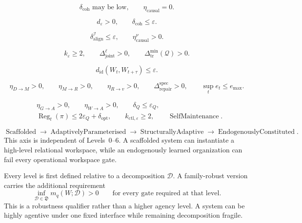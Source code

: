 

\[
\delta_{\mathrm{coh}}\text{ may be low},
\qquad
\eta_{\mathrm{causal}}=0.
\]

\[
d_\varepsilon>0,
\qquad
\delta_{\mathrm{coh}}\leq\varepsilon.
\]

\[
\delta_{\mathrm{align}}^{\mathcal I}\leq\varepsilon,
\qquad
\eta_{\mathrm{causal}}^\nu>0.
\]

\[
k_\varepsilon\geq2,
\qquad
\Delta_{\mathrm{joint}}^\ell>0,
\qquad
\Delta_{\mathrm{tr}}^{\min}(\mathcal Q)>0.
\]

\[
d_{\mathrm{id}}(W_t,W_{t+\tau})
\leq\varepsilon.
\]

\[
\eta_{D\to M}>0,
\qquad
\eta_{M\to R}>0,
\qquad
\eta_{R\to v}>0,
\qquad
\Delta_{\mathrm{repair}}^{\mathrm{spec}}>0,
\qquad
\sup_t e_t\leq e_{\max}.
\]

\[
\begin{aligned}
&\eta_{G\to A}>0,
\qquad
\eta_{W\to A}>0,
\qquad
\delta_Q\leq\varepsilon_Q,\\
&\operatorname{Reg}_t(\pi)
 \leq2\varepsilon_Q+\delta_{\mathrm{opt}},
\qquad
k_{\mathrm{ctl},\varepsilon}\geq2,
\qquad
\operatorname{SelfMaintenance}.
\end{aligned}
\]

\[
\operatorname{Scaffolded}
\longrightarrow
\operatorname{AdaptivelyParameterised}
\longrightarrow
\operatorname{StructurallyAdaptive}
\longrightarrow
\operatorname{EndogenouslyConstituted}.
\]
This axis is independent of Levels~0--6. A scaffolded system can instantiate a
high-level relational workspace, while an endogenously learned organization
can fail every operational workspace gate.


Every level is first defined relative to a decomposition \(\mathcal D\). A
family-robust version carries the additional requirement
\[
\inf_{\mathcal D\in\mathfrak D}
 m_q(W;\mathcal D)>0
\qquad
\text{for every gate required at that level}.
\]
This is a robustness qualifier rather than a higher agency level. A system can
be highly agentive under one fixed interface while remaining decomposition
fragile.

